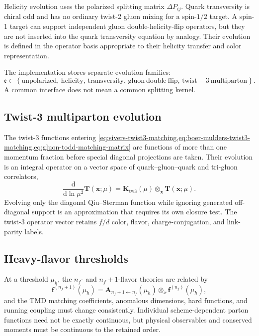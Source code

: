 \documentclass[11pt]{article}
\newcommand{\dd}{\mathrm{d}}
\newcommand{\otimesx}{\mathop{\otimes}_{x}}
\newcommand{\tw}{\mathrm{tw}}
\begin{document}
Helicity evolution uses the polarized splitting matrix
\(\Delta P_{ij}\).  Quark transversity is chiral odd and has no ordinary
twist-2 gluon mixing for a spin-\(1/2\) target.  A spin-1 target can support
independent gluon double-helicity-flip operators, but they are not inserted
into the quark transversity equation by analogy.  Their evolution is defined
in the operator basis appropriate to their helicity transfer and color
representation.

The implementation stores separate evolution families:
\begin{equation}
 \mathfrak e\in
 \left\{
 \mathrm{unpolarized},\,
 \mathrm{helicity},\,
 \mathrm{transversity},\,
 \mathrm{gluon\ double\ flip},\,
 \mathrm{twist\!-\!3\ multiparton}
 \right\}.
 \label{eq:collinear-evolution-families}
\end{equation}
A common interface does not mean a common splitting kernel.

\subsection{Twist-3 multiparton evolution}

The twist-3 functions entering
\cref{eq:sivers-twist3-matching,eq:boer-mulders-twist3-matching,eq:gluon-todd-matching-matrix}
are functions of more than one momentum fraction before special diagonal
projections are taken.  Their evolution is an integral operator on a vector
space of quark--gluon--quark and tri-gluon correlators,
\begin{equation}
 \frac{\dd}{\dd\ln\mu^2}\bm T(\bm x;\mu)
 =\bm K_{\tw3}(\mu)\otimes_{\bm x}\bm T(\bm x;\mu).
 \label{eq:twist3-evolution}
\end{equation}
Evolving only the diagonal Qiu--Sterman function while ignoring generated
off-diagonal support is an approximation that requires its own closure test.
The twist-3 operator vector retains \(f/d\) color, flavor, charge-conjugation,
and link-parity labels.

\subsection{Heavy-flavor thresholds}

At a threshold \(\mu_h\), the \(n_f\)- and \(n_f+1\)-flavor theories are
related by
\begin{equation}
 \bm f^{(n_f+1)}(\mu_h)
 =\bm A_{n_f+1\leftarrow n_f}(\mu_h)
 \otimesx
 \bm f^{(n_f)}(\mu_h),
 \label{eq:collinear-threshold-map}
\end{equation}
and the TMD matching coefficients, anomalous dimensions, hard functions, and
running coupling must change consistently.  Individual scheme-dependent
parton functions need not be exactly continuous, but physical observables and
conserved moments must be continuous to the retained order.
\end{document}
